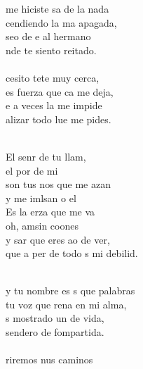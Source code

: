 \begin{cancion}%
	 me hiciste sa de la nada \\
	cendiendo la ma apagada,\\
	seo de e al hermano\\
	nde te siento reitado.\\
\jump\\
	cesito tete muy cerca,\\
	es fuerza que ca me deja,\\
	e a veces la  me impide\\
	alizar todo lue me pides.\\\jump\\
	\begin{chorus}%
	El senr de tu llam,\\
	el por de mi\\
	son tus nos que me azan\\
	y me imlsan o el \\
	Es la erza que me va\\
	oh,  amsin coones\\
	y sar que eres ao de ver,\\
	que a per de todo s mi debilid.\\
	\end{chorus}%
	\jump\\
	y tu nombre es s que palabras\\
	 tu voz que rena en mi alma,\\
	s mostrado un  de vida,\\
	 sendero de fompartida.\\
\jump\\
	riremos nus caminos \\

\end{cancion}
